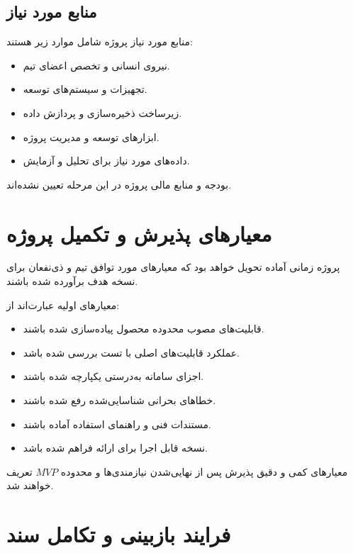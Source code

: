 \documentclass[12pt,a4paper]{article}
\begin{document}
	\subsection{منابع مورد نیاز}
	
	منابع مورد نیاز پروژه شامل موارد زیر هستند:
	
	\begin{itemize}
		\item نیروی انسانی و تخصص اعضای تیم.
		\item تجهیزات و سیستم‌های توسعه.
		\item زیرساخت ذخیره‌سازی و پردازش داده.
		\item ابزارهای توسعه و مدیریت پروژه.
		\item داده‌های مورد نیاز برای تحلیل و آزمایش.
	\end{itemize}
	
	بودجه و منابع مالی پروژه در این مرحله
	تعیین نشده‌اند.
	
	
	\section{معیارهای پذیرش و تکمیل پروژه}
	
	پروژه زمانی آماده تحویل خواهد بود که
	معیارهای مورد توافق تیم و ذی‌نفعان
	برای نسخه هدف برآورده شده باشند.
	
	معیارهای اولیه عبارت‌اند از:
	
	\begin{itemize}
		\item قابلیت‌های مصوب محدوده محصول پیاده‌سازی شده باشند.
		\item عملکرد قابلیت‌های اصلی با تست بررسی شده باشد.
		\item اجزای سامانه به‌درستی یکپارچه شده باشند.
		\item خطاهای بحرانی شناسایی‌شده رفع شده باشند.
		\item مستندات فنی و راهنمای استفاده آماده باشند.
		\item نسخه قابل اجرا برای ارائه فراهم شده باشد.
	\end{itemize}
	
	معیارهای کمی و دقیق پذیرش پس از نهایی‌شدن
	نیازمندی‌ها و محدوده $MVP$ تعریف خواهند شد.
	
	
	\section{فرایند بازبینی و تکامل سند}
	
\end{document}
